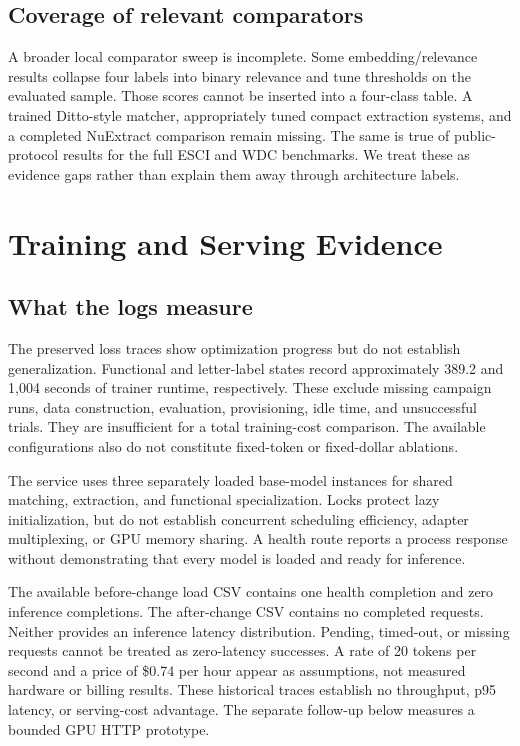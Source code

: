 \subsection{Coverage of relevant comparators}
A broader local comparator sweep is incomplete. Some embedding/relevance results collapse four labels into binary relevance and tune thresholds on the evaluated sample. Those scores cannot be inserted into a four-class table. A trained Ditto-style matcher, appropriately tuned compact extraction systems, and a completed NuExtract comparison remain missing. The same is true of public-protocol results for the full ESCI and WDC benchmarks. We treat these as evidence gaps rather than explain them away through architecture labels.

\section{Training and Serving Evidence}
\subsection{What the logs measure}
The preserved loss traces show optimization progress but do not establish generalization. Functional and letter-label states record approximately 389.2 and 1,004 seconds of trainer runtime, respectively. These exclude missing campaign runs, data construction, evaluation, provisioning, idle time, and unsuccessful trials. They are insufficient for a total training-cost comparison. The available configurations also do not constitute fixed-token or fixed-dollar ablations.

The service uses three separately loaded base-model instances for shared matching, extraction, and functional specialization. Locks protect lazy initialization, but do not establish concurrent scheduling efficiency, adapter multiplexing, or GPU memory sharing. A health route reports a process response without demonstrating that every model is loaded and ready for inference.

The available before-change load CSV contains one health completion and zero inference completions. The after-change CSV contains no completed requests. Neither provides an inference latency distribution. Pending, timed-out, or missing requests cannot be treated as zero-latency successes. A rate of 20 tokens per second and a price of \$0.74 per hour appear as assumptions, not measured hardware or billing results. These historical traces establish no throughput, p95 latency, or serving-cost advantage. The separate follow-up below measures a bounded GPU HTTP prototype.

